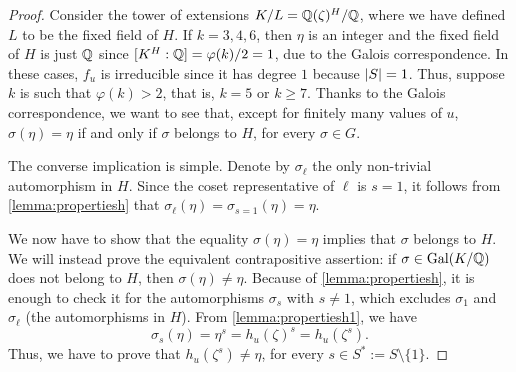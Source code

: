 \documentclass[../main.tex]{subfiles}
\begin{document}
\begin{proof}
	Consider the tower of extensions $K/L=\mathbb{Q}(\zeta)^H/\mathbb{Q}$, where we have defined $L$ to be the fixed field of $H$. If $k=3,4,6$, then $\eta$ is an integer and the fixed field of $H$ is just $\mathbb{Q}$ since $[K^H:\mathbb{Q}]=\varphi(k)/2=1$, due to the Galois correspondence. In these cases, $f_u$ is irreducible since it has degree $1$ because $\abs{S}=1$. Thus, suppose $k$ is such that $\varphi(k)>2$, that is, $k=5$ or $k\geqslant 7$. Thanks to the Galois correspondence, we want to see that, except for finitely many values of $u$, $\sigma(\eta)=\eta$ if and only if $\sigma$ belongs to $H$, for every $\sigma\in G$. 
	
	The converse implication is simple. Denote by $\sigma_\ell$ the only non-trivial automorphism in $H$. Since the coset representative of $\ell$ is $s=1$, it follows from \cref{lemma:propertiesh} that $\sigma_\ell(\eta)=\sigma_{s=1}(\eta)=\eta$.
	
	We now have to show that the equality $\sigma(\eta)=\eta$ implies that $\sigma$ belongs to $H$. We will instead prove the equivalent contrapositive assertion: if $\sigma\in\operatorname{Gal}(K/\mathbb{Q})$ does not belong to $H$, then $\sigma(\eta)\neq\eta$. Because of \cref{lemma:propertiesh}, it is enough to check it for the automorphisms $\sigma_s$ with $s\neq 1$, which excludes $\sigma_1$ and $\sigma_\ell$ (the automorphisms in $H$). From \cref{lemma:propertiesh1}, we have
	\begin{equation*}
		\sigma_s(\eta)=\eta^s=h_u(\zeta)^s=h_u(\zeta^s).
	\end{equation*}
	Thus, we have to prove that $h_u(\zeta^s)\neq \eta$, for every $s\in S^*:=S\setminus \{1\}$. 
	

\end{proof}
\end{document}
